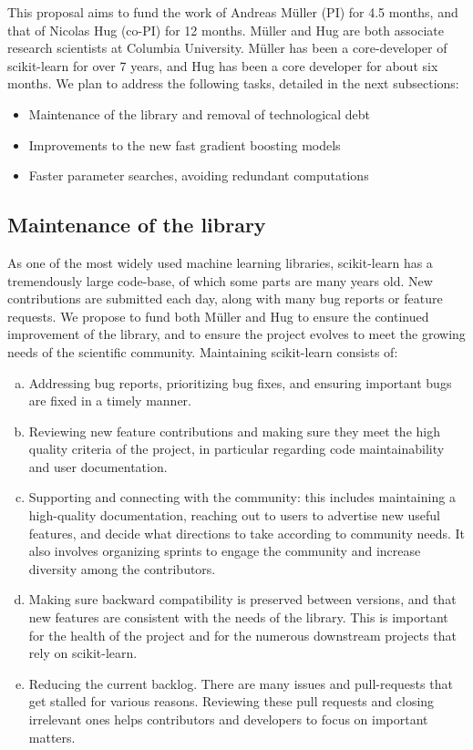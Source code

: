\documentclass[11pt]{article}  %
\begin{document}
This proposal aims to fund the work of Andreas M\"uller (PI) for 4.5 months,
and that of Nicolas Hug (co-PI) for 12 months. M\"uller and Hug are both
associate research scientists at Columbia University. M\"uller has been a
core-developer of scikit-learn for over 7 years, and Hug has been a core
developer for about six months. We plan to address the following tasks,
detailed in the next subsections:
\begin{itemize}
\item Maintenance of the library and removal of technological debt
\item Improvements to the new fast gradient boosting models
\item Faster parameter searches, avoiding redundant computations
\end{itemize}

\subsection{Maintenance of the library}

As one of the most widely used machine learning libraries, scikit-learn has
a tremendously large code-base, of which some parts are many years old. New contributions are submitted each day, along with many bug reports or
feature requests. We propose to fund both M\"uller and Hug to ensure the
continued improvement of the library, and to ensure the project evolves to
meet the growing needs of the scientific community. Maintaining scikit-learn consists of:

\begin{enumerate}[a)]
\item Addressing bug reports, prioritizing bug fixes, and ensuring important bugs are fixed in a timely manner.
\item Reviewing new feature contributions and making sure they meet the high
quality criteria of the project, in particular regarding code
maintainability and user documentation.
\item Supporting and connecting with the community: this includes
maintaining a high-quality documentation, reaching out to users to advertise
new useful features, and decide what directions to take according to community
needs. It also involves organizing sprints to engage the community and
increase diversity among the contributors.
\item Making sure backward compatibility is preserved between versions, and
that new features are consistent with the needs of the library. This is
important for the health of the project and for the numerous downstream
projects that rely on scikit-learn.
\item Reducing the current backlog. There are many issues and pull-requests that get stalled for various reasons. Reviewing these pull requests and closing irrelevant ones helps contributors and developers to focus on important matters.
\end{enumerate}
\end{document}
